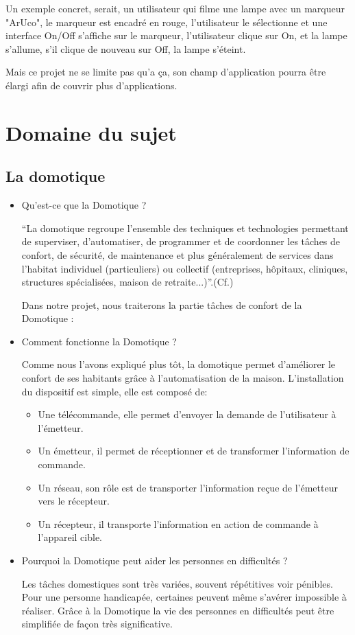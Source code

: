\documentclass[12pt,a4paper]{article}
\begin{document}
Un exemple concret, serait, un utilisateur qui filme une lampe avec un marqueur "ArUco", le marqueur est encadré en rouge, l'utilisateur le sélectionne et une interface On/Off s'affiche sur le marqueur, l'utilisateur clique sur On, et la lampe s'allume, s’il clique de nouveau sur Off, la lampe s'éteint.\par

Mais ce projet ne se limite pas qu'a ça, son champ d'application pourra être élargi afin de couvrir plus d'applications.
\newpage
\section{Domaine du sujet}
\subsection{La domotique}
\begin{itemize}
\item Qu'est-ce que la Domotique ?  \par
``La domotique regroupe l'ensemble des techniques et technologies permettant de superviser, d'automatiser, de programmer et de coordonner les tâches de confort, de sécurité, de maintenance et plus généralement de services dans l'habitat individuel (particuliers) ou collectif (entreprises, hôpitaux, cliniques, structures spécialisées, maison de retraite...)''.(Cf.\cite{Ref15})\par
Dans notre projet, nous traiterons la partie tâches de confort de la Domotique :
\end{itemize}
\begin{itemize}
\item  Comment fonctionne la Domotique ? \par
  Comme nous l'avons expliqué plus tôt, la domotique permet d'améliorer le confort de ses habitants grâce à l'automatisation de la maison. L'installation du dispositif est simple, elle est composé de:

 \begin{itemize}
 \item Une télécommande, elle permet d'envoyer la demande de l'utilisateur à l'émetteur.
 \item Un émetteur, il permet de réceptionner et de transformer l'information de commande.
 \item  Un réseau, son rôle est de transporter l'information reçue de l'émetteur vers le récepteur.
 \item Un récepteur, il transporte l'information en action de commande à l'appareil cible.
\end{itemize}
\end{itemize}
\begin{itemize}
\item  Pourquoi la Domotique peut aider les personnes en difficultés ? \par
Les tâches domestiques sont très variées, souvent répétitives voir pénibles. Pour une personne handicapée, certaines peuvent même s'avérer impossible à réaliser. Grâce à la Domotique la vie des personnes en difficultés peut être simplifiée de façon très significative. 
\end{itemize}
\end{document}
